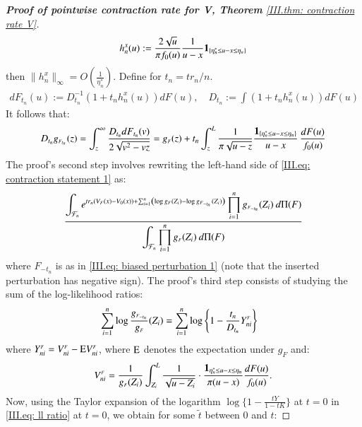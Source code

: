 \begin{proof}[\hypertarget{III.proof contraction pointwise V}{\textbf{Proof of pointwise contraction rate for V, Theorem} \ref{III.thm: contraction rate V}}]
    $$h_n^x(u) := \frac{2 \sqrt{u}}{\pi f_0(u)}  \frac{1}{u-x} \mathbf{1}_{ \{\eta_n^* \leq u - x \leq \eta_n \} }$$
    then $\| h_n^x \|_\infty = O(\frac{1}{\eta_n^*})$. Define for $t_n = t r_n/n$.
    \begin{align}\label{III.eq: biased perturbation 1}
        dF_{t_n}(u) := D^{-1}_{t_n} \left( 1 + t_n h^x_n (u) \right) dF(u), \quad D_{t_n} := \int \left( 1 + t_n h^x_n (u) \right) dF(u)
    \end{align}
    It follows that: 
    \begin{align*}
        D_{t_n} g_{\scriptscriptstyle{F_{\scaleto{t_n}{3.5pt}}}}(z) = \int_{z}^{\infty} \frac{D_{t_n} dF_{t_n}(v)}{2\sqrt{v^2 - vz}} =  g_{\scriptscriptstyle{F}}(z) + t_n  \int_{z}^{L} \frac{1}{\pi \sqrt{u-z}} \frac{\ind_{ \{\eta_n^* \leq u - x \leq \eta_n \} }}{u-x}  \, \frac{dF(u)}{f_0(u)}
    \end{align*}
    The proof's second step involves rewriting the left-hand side of \eqref{III.eq: contraction statement 1} as:
    \begin{align}\label{III.eq: rewrite ex bayes}
        \ddfrac{\int_{\mathcal{F}_n} e^{t r_n (V_{\scaleto{F}{3pt}} (x) - V_0(x)) + \sum_{i=1}^n \left(\log{g_{\scaleto{F}{3pt}}(Z_i)} - \log{g_{\scaleto{F_{-t_n}}{5.2pt}}(Z_i)} \right)} \prod_{i=1}^n g_{\scriptscriptstyle{F_{\scaleto{-t_n}{3.5pt}}}}(Z_i) \: d \Pi(F)}{\int_{\mathcal{F}_n} \prod_{i=1}^n g_{\scriptscriptstyle{F}}(Z_i) \: d \Pi(F)}
    \end{align}
    where $F_{-t_n}$ is as in \eqref{III.eq: biased perturbation 1} (note that the inserted perturbation has negative sign).  The proof's third step consists of studying the sum of the log-likelihood ratios:
    \begin{align}\label{III.eq: ll ratio}
        &\sum_{i=1}^n \log{\frac{g_{\scriptscriptstyle{F_{\scaleto{-t_n}{3.5pt}}}}}{g_{\scriptscriptstyle{F}}} (Z_i)} = \sum_{i=1}^n \log \left\{ 1 - \frac{t_n }{D_{t_n}} Y_{ni}^{\scriptscriptstyle{F}} \right\}
    \end{align}
    where $Y_{ni}^{\scriptscriptstyle{F}} = V_{ni}^{\scriptscriptstyle{F}} - \mathrm{E} V_{ni}^{\scriptscriptstyle{F}}$, where $\mathrm{E}$ denotes the expectation under $g_{\scriptscriptstyle{F}}$ and:
    \begin{align*}
        V_{ni}^{\scriptscriptstyle{F}} = \frac{1}{g_{\scriptscriptstyle{F}}(Z_i)} \int_{Z_i}^L \frac{1}{\sqrt{u-Z_i}} \cdot \frac{\mathbf{1}_{\eta_n^* \leq u - x \leq \eta_n}}{\pi (u-x)}  \frac{dF(u)}{f_0(u)}.
    \end{align*}
    Now, using the Taylor expansion of the logarithm $\log \{ 1 - \frac{tY}{1-tK} \}$ at $t=0$ in \eqref{III.eq: ll ratio} at $t=0$, we obtain for some $\tilde{t}$ between $0$ and $t$:

\end{proof}
